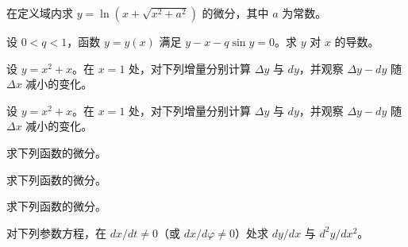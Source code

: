 \noindent\begin{minipage}{\textwidth}
在定义域内求 $y=\ln(x+\sqrt{x^2+a^2})$ 的微分，其中 $a$ 为常数。
\end{minipage}\par\vfill
\noindent\begin{minipage}{\textwidth}
设 $0<q<1$，函数 $y=y(x)$ 满足 $y-x-q\sin y=0$。求 $y$ 对 $x$ 的导数。
\end{minipage}\par\vfill
\newpage
\noindent\begin{minipage}{\textwidth}
设 $y=x^2+x$。在 $x=1$ 处，对下列增量分别计算 $\Delta y$ 与 $dy$，并观察 $\Delta y-dy$ 随 $\Delta x$ 减小的变化。
\end{minipage}\par\vfill
\noindent\begin{minipage}{\textwidth}
设 $y=x^2+x$。在 $x=1$ 处，对下列增量分别计算 $\Delta y$ 与 $dy$，并观察 $\Delta y-dy$ 随 $\Delta x$ 减小的变化。
\end{minipage}\par\vfill
\noindent\begin{minipage}{\textwidth}
求下列函数的微分。
\end{minipage}\par\vfill
\noindent\begin{minipage}{\textwidth}
求下列函数的微分。
\end{minipage}\par\vfill
\newpage
\noindent\begin{minipage}{\textwidth}
求下列函数的微分。
\end{minipage}\par\vfill
\noindent\begin{minipage}{\textwidth}
对下列参数方程，在 $dx/dt\ne0$（或 $dx/d\varphi\ne0$）处求 $dy/dx$ 与 $d^2y/dx^2$。
\end{minipage}\par\vfill
